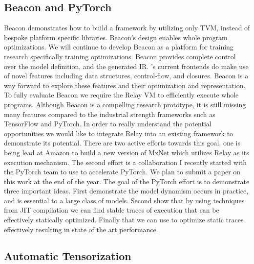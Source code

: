 \subsection{Beacon and PyTorch}

Beacon demonstrates how to build a framework
    by utilizing only TVM, instead of bespoke
    platform specific libraries.
Beacon's design enables whole program optimizations.
We will continue to develop Beacon as a platform for training
    research specifically training optimizations.
Beacon provides complete control over the model definition, and the generated IR.
\relay's current frontends do make use of novel \relay
    features including data structures, control-flow, and
    closures.
Beacon is a way forward to explore these features and their optimization
    and representation.
To fully evaluate Beacon we require the Relay VM to efficiently
    execute whole programs.
Although Beacon is a compelling research prototype, it is still missing many
    features compared to the industrial strength frameworks such as TensorFlow and PyTorch.
In order to really understand the potential opportunities we would like to integrate
    Relay into an existing framework to demonstrate its potential.
There are two active efforts towards this goal, one is being lead at Amazon
    to build a new version of MxNet which utilizes Relay as its execution
    mechanism.
The second effort is a collaboration I recently started with
    the PyTorch team to use \relay to accelerate PyTorch.
We plan to submit a paper on this work at the end of the year.
The goal of the PyTorch effort is to demonstrate three important
    ideas.
First demonstrate the model dynamism occurs in practice, and is
    essential to a large class of models.
Second show that by using techniques from JIT compilation we
    can find stable traces of execution that can be effectively
    statically optimized.
Finally that we can use \relay to optimize static traces effectively
    resulting in state of the art performance.

\subsection{Automatic Tensorization}

